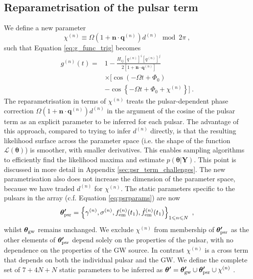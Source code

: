 \documentclass[fleqn,usenatbib,useAMS]{mnras}
\begin{document}
\subsection{Reparametrisation of the pulsar term} \label{sec:pulsar_term2}
We define a new parameter 
\begin{equation}
	\chi^{(n)} \equiv \Omega \left( 1 + \boldsymbol{n}\cdot \boldsymbol{q}^{(n)} \right)  d^{(n)} \mod 2 \pi \ ,
\end{equation}
such that Equation \eqref{eq:g_func_trig} becomes
\begin{align}
	g^{(n)}(t) =& 1 - \frac{ H_{ij}[q^{(n)}]^i [q^{(n)}]^j }{2 [1 + \boldsymbol{n}\cdot \boldsymbol{q}^{(n)}] } \nonumber \\
	& \times \Big[\cos\left(-\Omega t +\Phi_0\right) \nonumber \\
	&- \cos \left \{-\Omega t +\Phi_0 + \chi^{(n)} \right \} \Big ] \ .
	\label{eq:g_func_trig_chi}
\end{align}
The reparametrisation in terms of $\chi^{(n)}$ treats the pulsar-dependent phase correction $\Omega \left( 1 + \boldsymbol{n}\cdot \boldsymbol{q}^{(n)} \right)  d^{(n)}$ in the argument of the cosine of the pulsar term as an explicit parameter to be inferred for each pulsar. The advantage of this approach, compared to trying to infer $d^{(n)}$ directly, is that the resulting likelihood surface across the parameter space (i.e. the shape of the function $\mathcal{L}(\boldsymbol{\theta})$) is smoother, with smaller derivatives. This enables sampling algorithms to efficiently find the likelihood maxima and estimate $p(\boldsymbol{\theta} | \boldsymbol{Y})$. This point is discussed in more detail in Appendix \ref{sec:psr_term_challenges}. The new parametrisation also does not increase the dimension of the parameter space, because we have traded $d^{(n)}$ for $\chi^{(n)}$. The static parameters specific to the pulsars in the array (c.f. Equation \eqref{eq:psrparams}) are now
\begin{equation}
	\boldsymbol{\theta'}_{\rm psr} = \left \{ \gamma^{(n)},\sigma^{(n)}, f_{\rm em}^{(n)}(t_1),\dot{f}_{\rm em}^{(n)}(t_1) \right\}_{1\leq n \leq N} \ ,  \label{eq:psrparamsnew}
\end{equation}
whilst $\boldsymbol{\theta}_{\rm gw}$  remains unchanged. We exclude $\chi^{(n)}$ from membership of $\boldsymbol{\theta'}_{\rm psr}$ as the other elements of $\boldsymbol{\theta'}_{\rm psr}$ depend solely on the properties of the pulsar, with no dependence on the properties of the GW source. In contrast $\chi^{(n)}$ is a cross term that depends on both the individual pulsar and the GW. We define the complete set of $7 +4N + N$ static parameters to be inferred as $\boldsymbol{\theta'} = \boldsymbol{\theta'}_{\rm gw} \cup \boldsymbol{\theta'}_{\rm psr} \cup \chi^{(n)}$ . \newline 
\end{document}
